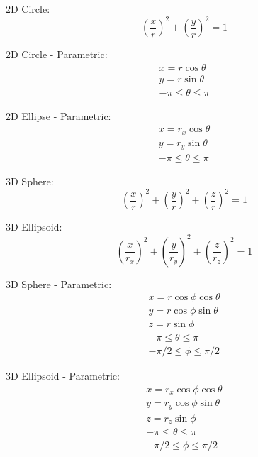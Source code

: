\begin{center}
	2D Circle:
	\begin{equation}
	\label{eqn:2dcirc}
	\left ( \frac{x}{r} \right )^2 + \left ( \frac{y}{r} \right )^2 = 1
	\end{equation}
	
	2D Circle - Parametric:
	\begin{equation}
	\label{eqn:2dcircpara}
	\begin{split}
	x = r\cos{\theta}  \\ y = r\sin{\theta} \\ -\pi \leq \theta \leq \pi
	\end{split}
	\end{equation}
	
	2D Ellipse - Parametric:
		\begin{equation}
	\label{eqn:2dellipsepara}
	\begin{split}
	x = r_x\cos{\theta}  \\ y = r_y\sin{\theta} \\ -\pi \leq \theta \leq \pi
	\end{split}
	\end{equation}
	
	3D Sphere:
	\begin{equation}
	\label{eqn:3dsphere}
	\left ( \frac{x}{r} \right )^2 + \left ( \frac{y}{r} \right )^2 + \left ( \frac{z}{r} \right )^2 = 1
	\end{equation}
	
	3D Ellipsoid:
	\begin{equation}
	\label{eqn:3dellipse}
	\left ( \frac{x}{r_x} \right )^2 + \left ( \frac{y}{r_y} \right )^2 + \left ( \frac{z}{r_z} \right )^2 = 1
	\end{equation}
	
	3D Sphere - Parametric:
	\begin{equation}
	\label{eqn:3dspherepara}
	\begin{split}
	x = r\cos{\phi}\cos{\theta}  \\ y = r\cos{\phi}\sin{\theta} \\ z = r\sin{\phi}\\ -\pi \leq \theta \leq \pi \\ -\pi/2 \leq \phi \leq \pi/2
	\end{split}
	\end{equation}
	
	3D Ellipsoid - Parametric:
	\begin{equation}
	\label{eqn:3dspherepara}
	\begin{split}
	x = r_x\cos{\phi}\cos{\theta}  \\ y = r_y\cos{\phi}\sin{\theta} \\ z = r_z\sin{\phi}\\ -\pi \leq \theta \leq \pi \\ -\pi/2 \leq \phi \leq \pi/2
	\end{split}
	\end{equation}
\end{center}


